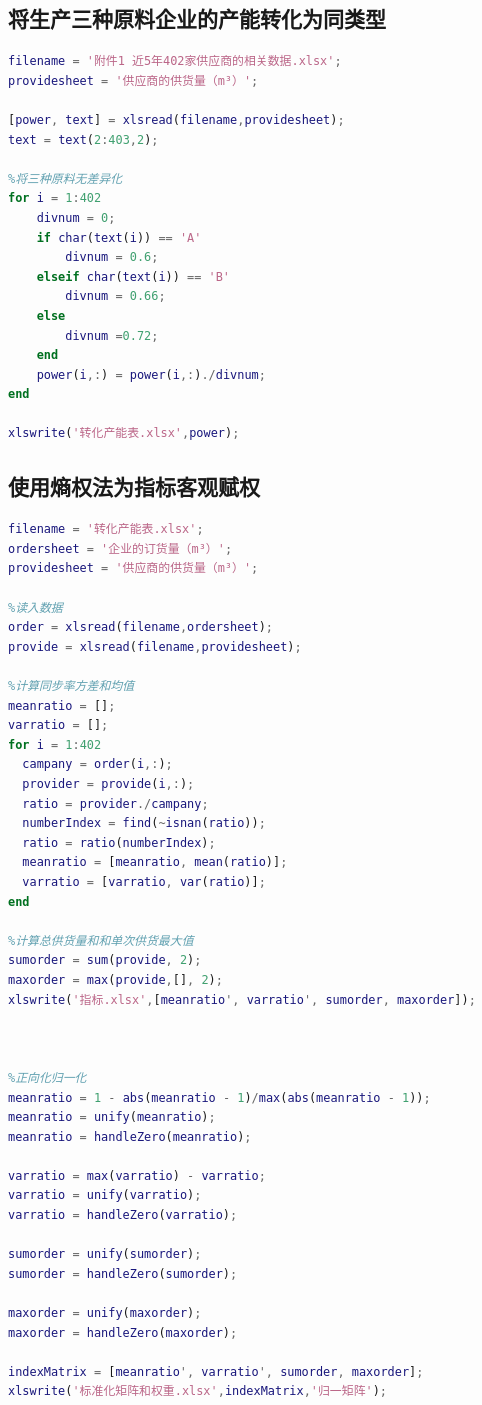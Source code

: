\documentclass[withoutpreface,bwprint]{cumcmthesis}
\begin{document}
\begin{appendices}
    \subsection{将生产三种原料企业的产能转化为同类型}
    \begin{lstlisting}[language=matlab]
filename = '附件1 近5年402家供应商的相关数据.xlsx';
providesheet = '供应商的供货量（m³）';

[power, text] = xlsread(filename,providesheet);
text = text(2:403,2);

%将三种原料无差异化
for i = 1:402
    divnum = 0;
    if char(text(i)) == 'A'
        divnum = 0.6;
    elseif char(text(i)) == 'B'
        divnum = 0.66;
    else
        divnum =0.72;
    end
    power(i,:) = power(i,:)./divnum;
end

xlswrite('转化产能表.xlsx',power);
\end{lstlisting}
    \subsection{使用熵权法为指标客观赋权}
    \begin{lstlisting}[language=matlab]
filename = '转化产能表.xlsx';
ordersheet = '企业的订货量（m³）';
providesheet = '供应商的供货量（m³）';

%读入数据
order = xlsread(filename,ordersheet);
provide = xlsread(filename,providesheet);

%计算同步率方差和均值
meanratio = [];
varratio = [];
for i = 1:402
  campany = order(i,:);
  provider = provide(i,:);
  ratio = provider./campany;
  numberIndex = find(~isnan(ratio));
  ratio = ratio(numberIndex);
  meanratio = [meanratio, mean(ratio)];
  varratio = [varratio, var(ratio)];
end

%计算总供货量和和单次供货最大值
sumorder = sum(provide, 2);
maxorder = max(provide,[], 2);
xlswrite('指标.xlsx',[meanratio', varratio', sumorder, maxorder]);



%正向化归一化
meanratio = 1 - abs(meanratio - 1)/max(abs(meanratio - 1));
meanratio = unify(meanratio);
meanratio = handleZero(meanratio);

varratio = max(varratio) - varratio;
varratio = unify(varratio);
varratio = handleZero(varratio);

sumorder = unify(sumorder);
sumorder = handleZero(sumorder);

maxorder = unify(maxorder);
maxorder = handleZero(maxorder);

indexMatrix = [meanratio', varratio', sumorder, maxorder];
xlswrite('标准化矩阵和权重.xlsx',indexMatrix,'归一矩阵');


\end{lstlisting}
\end{appendices}
\end{document}
